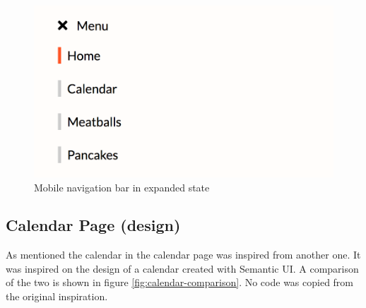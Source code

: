 \documentclass[a4paper]{scrartcl}
\begin{document}
\begin{figure}
	\includegraphics[width=\linewidth]{images/mobile-menu-expanded.png}
	\caption{Mobile navigation bar in expanded state}
	\label{fig:mobile-nav}
\end{figure}

\subsection{Calendar Page (design)}

As mentioned the calendar in the calendar page was inspired from another one. It was inspired on the design of a calendar created with Semantic UI. A comparison of the two is shown in figure \ref{fig:calendar-comparison}. No code was copied from the original inspiration.
\end{document}
